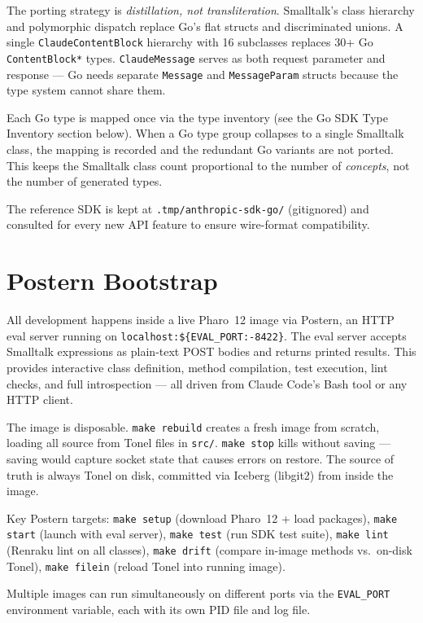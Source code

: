 \documentclass[a4paper,10pt,fleqn]{article}
\newcommand{\cls}[1]{\texttt{#1}}
\begin{document}
The porting strategy is \emph{distillation, not transliteration}.
Smalltalk's class hierarchy and polymorphic dispatch replace Go's flat
structs and discriminated unions.  A single \cls{ClaudeContentBlock}
hierarchy with 16 subclasses replaces 30+ Go \texttt{ContentBlock*}
types.  \cls{ClaudeMessage} serves as both request parameter and
response --- Go needs separate \texttt{Message} and
\texttt{MessageParam} structs because the type system cannot share them.

Each Go type is mapped once via the type inventory (see the Go SDK Type
Inventory section below).  When a Go type group collapses to a single
Smalltalk class, the mapping is recorded and the redundant Go variants
are not ported.  This keeps the Smalltalk class count proportional to
the number of \emph{concepts}, not the number of generated types.

The reference SDK is kept at \texttt{.tmp/anthropic-sdk-go/} (gitignored)
and consulted for every new API feature to ensure wire-format
compatibility.

\section{Postern Bootstrap}

All development happens inside a live Pharo~12 image via Postern, an
HTTP eval server running on \texttt{localhost:\$\{EVAL\_PORT:-8422\}}.
The eval server accepts Smalltalk expressions as plain-text POST bodies
and returns printed results.  This provides interactive class definition,
method compilation, test execution, lint checks, and full introspection
--- all driven from Claude Code's Bash tool or any HTTP client.

The image is disposable.  \texttt{make rebuild} creates a fresh image
from scratch, loading all source from Tonel files in \texttt{src/}.
\texttt{make stop} kills without saving --- saving would capture socket
state that causes errors on restore.  The source of truth is always
Tonel on disk, committed via Iceberg (libgit2) from inside the image.

Key Postern targets: \texttt{make setup} (download Pharo~12 + load
packages), \texttt{make start} (launch with eval server),
\texttt{make test} (run SDK test suite), \texttt{make lint} (Renraku
lint on all classes), \texttt{make drift} (compare in-image methods
vs.\ on-disk Tonel), \texttt{make filein} (reload Tonel into running
image).

Multiple images can run simultaneously on different ports via the
\texttt{EVAL\_PORT} environment variable, each with its own PID file
and log file.
\end{document}
